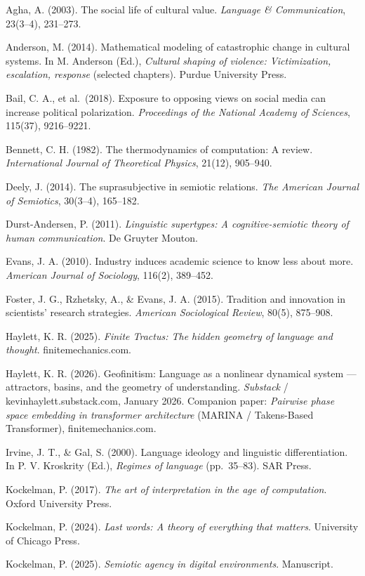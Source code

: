 \documentclass[
  11pt]{article}
\begin{document}
Agha, A. (2003). The social life of cultural value. \emph{Language \&
Communication}, 23(3--4), 231--273.

Anderson, M. (2014). Mathematical modeling of catastrophic change in
cultural systems. In M. Anderson (Ed.), \emph{Cultural shaping of
violence: Victimization, escalation, response} (selected chapters).
Purdue University Press.

Bail, C. A., et al.~(2018). Exposure to opposing views on social media
can increase political polarization. \emph{Proceedings of the National
Academy of Sciences}, 115(37), 9216--9221.

Bennett, C. H. (1982). The thermodynamics of computation: A review.
\emph{International Journal of Theoretical Physics}, 21(12), 905--940.

Deely, J. (2014). The suprasubjective in semiotic relations. \emph{The
American Journal of Semiotics}, 30(3--4), 165--182.

Durst-Andersen, P. (2011). \emph{Linguistic supertypes: A
cognitive-semiotic theory of human communication}. De Gruyter Mouton.

Evans, J. A. (2010). Industry induces academic science to know less
about more. \emph{American Journal of Sociology}, 116(2), 389--452.

Foster, J. G., Rzhetsky, A., \& Evans, J. A. (2015). Tradition and
innovation in scientists' research strategies. \emph{American
Sociological Review}, 80(5), 875--908.

Haylett, K. R. (2025). \emph{Finite Tractus: The hidden geometry of
language and thought}. finitemechanics.com.

Haylett, K. R. (2026). Geofinitism: Language as a nonlinear dynamical
system --- attractors, basins, and the geometry of understanding.
\emph{Substack} / kevinhaylett.substack.com, January 2026. Companion
paper: \emph{Pairwise phase space embedding in transformer architecture}
(MARINA / Takens-Based Transformer), finitemechanics.com.

Irvine, J. T., \& Gal, S. (2000). Language ideology and linguistic
differentiation. In P. V. Kroskrity (Ed.), \emph{Regimes of language}
(pp.~35--83). SAR Press.

Kockelman, P. (2017). \emph{The art of interpretation in the age of
computation}. Oxford University Press.

Kockelman, P. (2024). \emph{Last words: A theory of everything that
matters}. University of Chicago Press.

Kockelman, P. (2025). \emph{Semiotic agency in digital environments}.
Manuscript.
\end{document}
